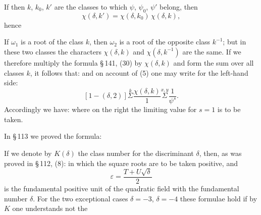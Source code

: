 If then $k$, $k_0$, $k'$ are the classes to which $\psi$, $\psi_0$, $\psi'$ belong, then
\[
\chi(\delta, k') = \chi(\delta, k_0)\,\chi(\delta, k),
\]
hence

If $\omega_1$ is a root of the class $k$, then $\omega_2$ is a root of the opposite class $k^{-1}$; but in these two classes the characters $\chi(\delta, k)$ and $\chi(\delta, k^{-1})$ are the same. If we therefore multiply the formula \S\,141, (30) by $\chi(\delta, k)$ and form the sum over all classes $k$, it follows that:
and on account of (5) one may write for the left-hand side:
\[
[1-(\delta,2)]\overset{k}{\Sigma}\frac{\chi(\delta,k)}{1}\overset{x,y}{\Sigma}\frac{1}{\psi^s}.
\]
Accordingly we have:
where on the right the limiting value for $s=1$ is to be taken.

In \S\,113 we proved the formula:

If we denote by $K(\delta)$ the class number for the discriminant $\delta$, then, as was proved in \S\,112, (8): %
in which the square roots are to be taken positive, and
\[
\varepsilon = \frac{T+U\sqrt{\delta}}{2}
\]
is the fundamental positive unit of the quadratic field with the fundamental number $\delta$. For the two exceptional cases $\delta=-3$, $\delta=-4$ these formulae hold if by $K$ one understands not the
